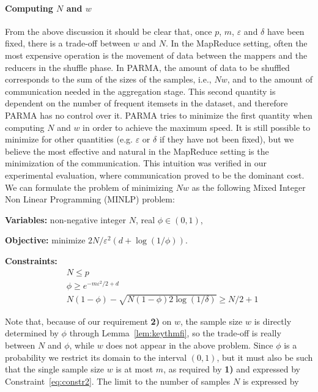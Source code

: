 \paragraph*{Computing $N$ and $w$} From the above discussion it should be clear
that, once $p$, $m$, $\varepsilon$ and $\delta$ have been fixed, there is a
trade-off between $w$ and $N$. In the MapReduce setting, often the most expensive
operation is the movement of data between the mappers and the reducers in the
shuffle phase. In PARMA, the amount of data to be shuffled corresponds to the
sum of the sizes of the samples, i.e., $Nw$, and to the amount of
communication needed in the aggregation stage. This second quantity is dependent
on the number of frequent itemsets in the dataset, and therefore PARMA has no
control over it. PARMA tries to minimize the first quantity when computing $N$ and
$w$ in order to achieve the maximum speed. It is still possible to minimize for
other quantities (e.g. $\varepsilon$ or $\delta$ if they have not been fixed),
but we believe the most effective and natural in the MapReduce setting is the
minimization of the communication.  This intuition was verified in our
experimental evaluation, where communication proved to be the dominant cost. We
can formulate the problem of minimizing $Nw$ as the following Mixed Integer Non
Linear Programming (MINLP) problem:
\begin{itemize*}
  \item {\bf Variables:} non-negative integer $N$, real $\phi\in(0,1)$,
  \item {\bf Objective:} minimize $2N/\varepsilon^2 (d+\log(1/\phi))$.
  \item {\bf Constraints:}
    \begin{align}
      &N \le p \label{eq:constr1}\\
      &\phi \ge e^{-m\varepsilon^2/2 + d} \label{eq:constr2}\\
      &N(1-\phi)-\sqrt{N(1-\phi)2\log(1/\delta)} \ge N/2 + 1 \label{eq:constr3}
    \end{align}
\end{itemize*}
Note that, because of our requirement {\bf 2)} on $w$, the sample size $w$ is directly
determined by $\phi$ through Lemma~\ref{lem:keythmfi}, so the trade-off is
really between $N$ and $\phi$, while $w$ does not appear in the above problem.
Since $\phi$ is a probability we restrict its
domain to the interval $(0,1)$, but it must also be such that the single sample size
$w$ is at most $m$, as required by {\bf 1)} and expressed by
Constraint~\eqref{eq:constr2}. The limit to the number of samples $N$ is expressed by
